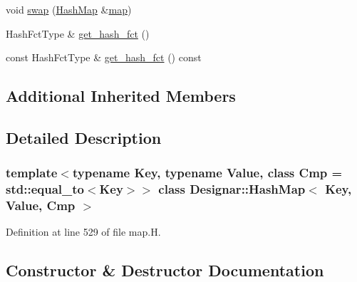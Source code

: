 \begin{DoxyCompactItemize}
\item 
void \hyperlink{class_designar_1_1_hash_map_af4390f5bdd5a0ec5b1d62d0630420854}{swap} (\hyperlink{class_designar_1_1_hash_map}{Hash\+Map} \&\hyperlink{class_designar_1_1_container_algorithms_a3b9044a197e4ceec6a1de03de197a293}{map})
\item 
Hash\+Fct\+Type \& \hyperlink{class_designar_1_1_hash_map_abcb9cdbb25c6d35f0f0373011265d570}{get\+\_\+hash\+\_\+fct} ()
\item 
const Hash\+Fct\+Type \& \hyperlink{class_designar_1_1_hash_map_a7372936ee9f2da7dbbc06a54955b9833}{get\+\_\+hash\+\_\+fct} () const
\end{DoxyCompactItemize}
\subsection*{Additional Inherited Members}


\subsection{Detailed Description}
\subsubsection*{template$<$typename Key, typename Value, class Cmp = std\+::equal\+\_\+to$<$\+Key$>$$>$\newline
class Designar\+::\+Hash\+Map$<$ Key, Value, Cmp $>$}



Definition at line 529 of file map.\+H.



\subsection{Constructor \& Destructor Documentation}
\mbox{\label{class_designar_1_1_hash_map_a39b8b365b9399ca72142f522d8d4e877}} 
